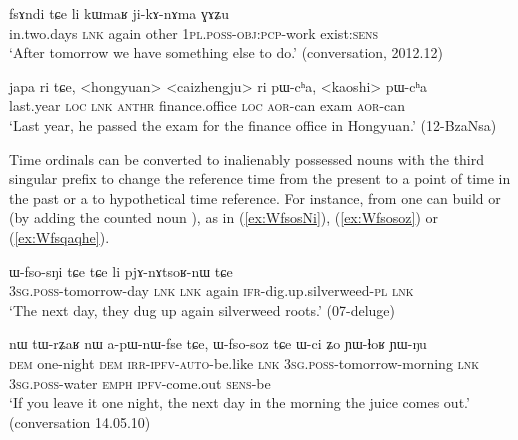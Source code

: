 \begin{exe}
\ex \label{ex:fsAndi}
\gll fsɤndi tɕe li kɯmaʁ ji-kɤ-nɤma ɣɤʑu \\
 in.two.days \textsc{lnk} again other \textsc{1pl}.\textsc{poss}-\textsc{obj}:\textsc{pcp}-work exist:\textsc{sens} \\
\glt `After tomorrow we have something else to do.' (conversation, 2012.12)
\end{exe}
 
\begin{exe}
\ex \label{ex:japa.ri}
\gll  japa ri tɕe, <hongyuan> <caizhengju> ri pɯ-cʰa, <kaoshi> pɯ-cʰa  \\
 last.year \textsc{loc} \textsc{lnk}  \textsc{anthr} finance.office \textsc{loc} \textsc{aor}-can exam \textsc{aor}-can \\
\glt `Last year, he passed the exam for the finance office in Hongyuan.' (12-BzaNsa)
\end{exe}
 
  
Time ordinals can be converted to inalienably possessed nouns with the third singular prefix  to change the reference time from the present to a point of time in the past or a to hypothetical time reference. For instance,  from  one can build  or  (by adding the counted noun ), as in (\ref{ex:WfsosNi}), (\ref{ex:Wfsosoz}) or (\ref{ex:Wfsqaqhe}).

\begin{exe}
\ex \label{ex:WfsosNi}
\gll  ɯ-fso-sŋi tɕe tɕe li pjɤ-nɤtsoʁ-nɯ tɕe \\ 
 \textsc{3sg}.\textsc{poss}-tomorrow-day \textsc{lnk} \textsc{lnk} again \textsc{ifr}-dig.up.silverweed-\textsc{pl}  \textsc{lnk}\\
\glt `The next day, they dug up again silverweed roots.' (07-deluge) 
\end{exe}
  
\begin{exe}
\ex \label{ex:Wfsosoz}
\gll nɯ tɯ-rʑaʁ nɯ a-pɯ-nɯ-fse tɕe, ɯ-fso-soz tɕe ɯ-ci ʑo ɲɯ-ɬoʁ ɲɯ-ŋu  \\
 \textsc{dem} one-night \textsc{dem} \textsc{irr}-\textsc{ipfv}-\textsc{auto}-be.like \textsc{lnk} \textsc{3sg}.\textsc{poss}-tomorrow-morning \textsc{lnk} \textsc{3sg}.\textsc{poss}-water \textsc{emph} \textsc{ipfv}-come.out \textsc{sens}-be \\
\glt `If you leave it one night, the next day in the morning the juice comes out.' (conversation 14.05.10)
\end{exe}
   
